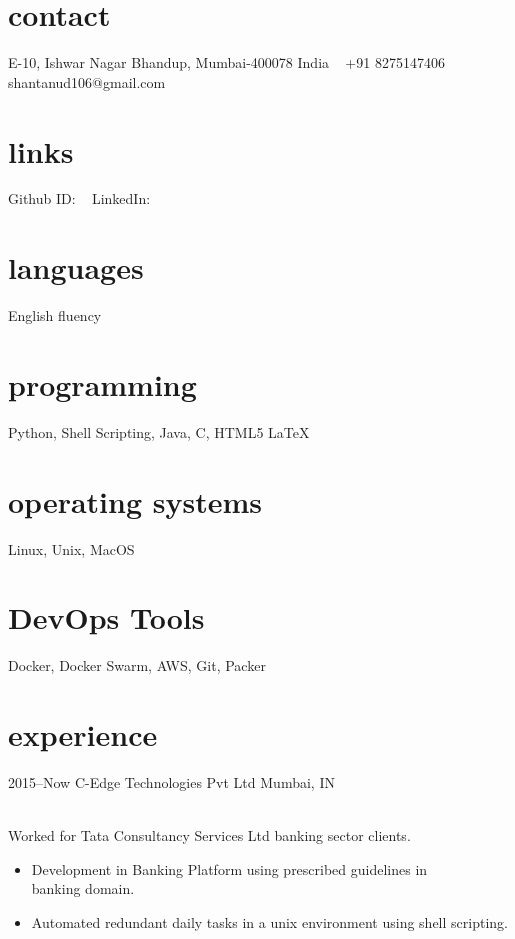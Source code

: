 \documentclass[]{cv-style}          %
\begin{document}

\lastupdated


\begin{aside}
%
\section{contact}\small
E-10, Ishwar Nagar
Bhandup, Mumbai-400078
India
~
+91 8275147406
~
shantanud106@gmail.com
~
%
\section{links}
Github ID:
~
LinkedIn:
~
%
\section{languages}
English fluency
%
\section{programming}
Python, Shell Scripting,
Java, C, HTML5
\LaTeX{}
%
\section{operating systems}
Linux, Unix, MacOS
%
\section{DevOps Tools}
Docker, Docker Swarm,
AWS, Git, Packer 
%
\end{aside}


\section{experience}

\begin{entrylist}
\entry
  {2015--Now}
  {C-Edge Technologies Pvt Ltd}
  {Mumbai, IN}
  {\\
  Worked for Tata Consultancy Services Ltd banking sector clients. 
  \begin{itemize}
  \item Development in Banking Platform using prescribed guidelines in \\
        banking domain. 
  \item Automated redundant daily tasks in a unix environment using shell scripting.
  \end{itemize}
  }

\end{entrylist}
\end{document}
